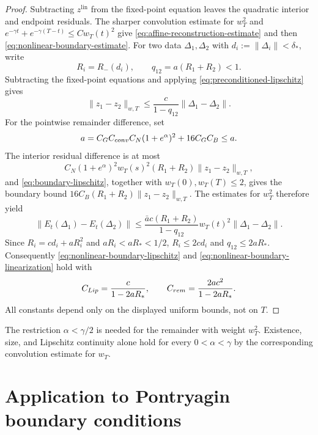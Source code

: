 \documentclass[twocolumn,nameyear,amsthm]{autart}
\newcommand{\lin}{\mathrm{lin}}
\numberwithin{equation}{section}
\begin{document}
\begin{proof}
Subtracting $z^{\lin}$ from the fixed-point equation leaves the quadratic
interior and endpoint residuals.  The sharper convolution estimate for $w_T^2$ and
$e^{-\gamma t}+e^{-\gamma(T-t)}\le Cw_T(t)^2$ give
\eqref{eq:affine-reconstruction-estimate} and then
\eqref{eq:nonlinear-boundary-estimate}.  For two data $\Delta_1,\Delta_2$
with $d_i:=\|\Delta_i\|<\delta_*$, write
\[
 R_i=R_-(d_i),\qquad
 q_{12}=a(R_1+R_2)<1.
\]
Subtracting the fixed-point equations and applying
\eqref{eq:preconditioned-lipschitz} gives
\begin{equation}\label{eq:explicit-two-data-lipschitz}
 \|z_1-z_2\|_{w,T}
 \le\frac{c}{1-q_{12}}\|\Delta_1-\Delta_2\|.
\end{equation}
For the pointwise remainder difference, set
\begin{equation}\label{eq:pointwise-residual-constant}
 \bar a=C_GC_{\rm conv}C_N(1+e^\alpha)^2+16C_GC_B\le a.
\end{equation}
The interior residual difference is at most
\[
 C_N(1+e^\alpha)^2w_T(s)^2(R_1+R_2)
 \|z_1-z_2\|_{w,T},
\]
and \eqref{eq:boundary-lipschitz}, together with
$w_T(0),w_T(T)\le2$, gives the boundary bound
$16C_B(R_1+R_2)\|z_1-z_2\|_{w,T}$.  The estimates for $w_T^2$ therefore
yield
\begin{equation}\label{eq:explicit-two-data-remainder}
 \|E_t(\Delta_1)-E_t(\Delta_2)\|
 \le\frac{\bar a c(R_1+R_2)}{1-q_{12}}
 w_T(t)^2\|\Delta_1-\Delta_2\|.
\end{equation}
Since $R_i=cd_i+aR_i^2$ and $aR_i<aR_*<1/2$,
$R_i\le2cd_i$ and $q_{12}\le2aR_*$.  Consequently
\eqref{eq:nonlinear-boundary-lipschitz} and
\eqref{eq:nonlinear-boundary-linearization} hold with
\begin{equation}\label{eq:explicit-two-data-constants}
 C_{\rm Lip}=\frac{c}{1-2aR_*},\qquad
 C_{\rm rem}=\frac{2\bar a c^2}{1-2aR_*}.
\end{equation}
All constants depend only on the displayed uniform bounds, not on $T$.
\end{proof}

The restriction $\alpha<\gamma/2$ is needed for the remainder with weight
$w_T^2$.  Existence, size, and Lipschitz continuity alone hold for every
$0<\alpha<\gamma$ by the corresponding convolution estimate for $w_T$.

\section{Application to Pontryagin boundary conditions}\label{sec:branches}
\end{document}
